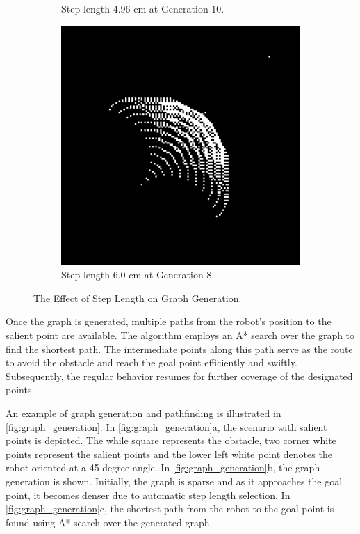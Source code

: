 \begin{figure}[H]
\begin{subfigure}{0.3\textwidth}
        \caption{Step length 4.96 cm at Generation 10.}
    \end{subfigure}
    \hfill
    \begin{subfigure}{0.3\textwidth}
        \centering
        \includegraphics[width=\textwidth]{Images/Algorithm_obs/graph/Setting_step_length_for_graph_generation/60_dist_6.0_step_len_0.11_over.png}
        \caption{Step length 6.0 cm at Generation 8.}
    \end{subfigure}
    \caption{The Effect of Step Length on Graph Generation.\label{fig:step_length}} 
\end{figure}


Once the graph is generated, multiple paths from the robot's position to the salient point are available. The algorithm employs an A* search over the graph to find the shortest path. The intermediate points along this path serve as the route to avoid the obstacle and reach the goal point efficiently and swiftly. Subsequently, the regular behavior resumes for further coverage of the designated points.

\vspace{3mm}  

An example of graph generation and pathfinding is illustrated in \autoref{fig:graph_generation}. In \autoref{fig:graph_generation}a, the scenario with salient points is depicted. The while square represents the obstacle, two corner white points represent the salient points and the lower left white point denotes the robot oriented at a 45-degree angle. In \autoref{fig:graph_generation}b, the graph generation is shown. Initially, the graph is sparse and as it approaches the goal point, it becomes denser due to automatic step length selection. In \autoref{fig:graph_generation}c, the shortest path from the robot to the goal point is found using A* search over the generated graph.


